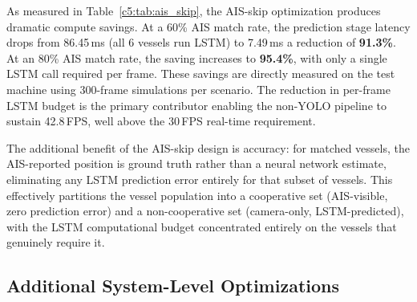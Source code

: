 \begin{table}[H]
\fontsize{10}{12}\selectfont
\centering
\caption{Measured Compute Saving from AIS-Matched LSTM Skip Optimization (6 vessels/frame, 300 iterations)}
\label{c5:tab:ais_skip}
\end{table}

As measured in Table~\ref{c5:tab:ais_skip}, the AIS-skip optimization produces dramatic compute savings. At a 60\% AIS match rate, the prediction stage latency drops from 86.45\,ms (all 6 vessels run LSTM) to 7.49\,ms \textemdash{} a reduction of \textbf{91.3\%}. At an 80\% AIS match rate, the saving increases to \textbf{95.4\%}, with only a single LSTM call required per frame. These savings are directly measured on the test machine using 300-frame simulations per scenario. The reduction in per-frame LSTM budget is the primary contributor enabling the non-YOLO pipeline to sustain 42.8\,FPS, well above the 30\,FPS real-time requirement.

The additional benefit of the AIS-skip design is accuracy: for matched vessels, the AIS-reported position is ground truth rather than a neural network estimate, eliminating any LSTM prediction error entirely for that subset of vessels. This effectively partitions the vessel population into a cooperative set (AIS-visible, zero prediction error) and a non-cooperative set (camera-only, LSTM-predicted), with the LSTM computational budget concentrated entirely on the vessels that genuinely require it.

\subsection{Additional System-Level Optimizations}

